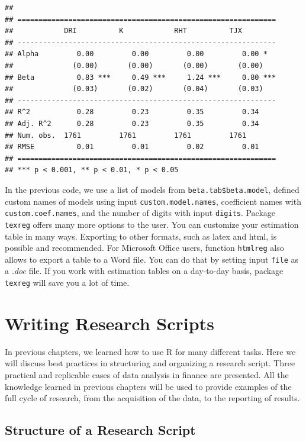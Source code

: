 \documentclass[11pt,]{book}
\begin{document}
\begin{verbatim}
## 
## =============================================================
##            DRI          K            RHT          TJX        
## -------------------------------------------------------------
## Alpha         0.00         0.00         0.00         0.00 *  
##              (0.00)       (0.00)       (0.00)       (0.00)   
## Beta          0.83 ***     0.49 ***     1.24 ***     0.80 ***
##              (0.03)       (0.02)       (0.04)       (0.03)   
## -------------------------------------------------------------
## R^2           0.28         0.23         0.35         0.34    
## Adj. R^2      0.28         0.23         0.35         0.34    
## Num. obs.  1761         1761         1761         1761       
## RMSE          0.01         0.01         0.02         0.01    
## =============================================================
## *** p < 0.001, ** p < 0.01, * p < 0.05
\end{verbatim}

In the previous code, we use a list of models from
\texttt{beta.tab\$beta.model}, defined custom names of models using
input \texttt{custom.model.names}, coefficient names with
\texttt{custom.coef.names}, and the number of digits with input
\texttt{digits}. Package \texttt{texreg} offers many more options to the
user. You can customize your estimation table in many ways. Exporting to
other formats, such as latex and html, is possible and recommended. For
Microsoft Office users, function \texttt{htmlreg} also allows to export
a table to a Word file. You can do that by setting input \texttt{file}
as a \emph{.doc} file. If you work with estimation tables on a
day-to-day basis, package \texttt{texreg} will save you a lot of time.

\chapter{Writing Research Scripts}\label{research-scripts}

In previous chapters, we learned how to use R for many different tasks.
Here we will discuss best practices in structuring and organizing a
research script. Three practical and replicable cases of data analysis
in finance are presented. All the knowledge learned in previous chapters
will be used to provide examples of the full cycle of research, from the
acquisition of the data, to the reporting of results.

\section{Structure of a Research
Script}\label{structure-of-a-research-script}
\end{document}
